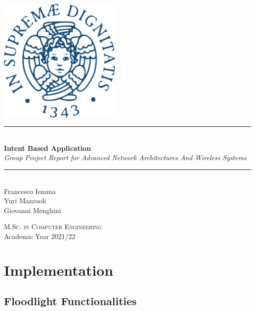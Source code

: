 \documentclass[a4paper]{report}
\newcommand{\HRule}{\rule{\linewidth}{0.5mm}}
\begin{document}
	\begin{titlepage}
		\begin{center}
			
			\includegraphics[width=0.45\textwidth]{img/unipi.png}~\\[2.5cm]
			
			
			\HRule \\[0.4cm]
			{ \LARGE 
				\textbf{Intent Based Application}\\[0.4cm]
				\emph{Group Project Report for Advanced Network Architectures And Wireless Systems}\\[0.4cm]
			}
			\HRule \\[1.5cm]
			
			
			
			{ \large
				Francesco Iemma \\[0.1cm]
				Yuri Mazzuoli \\[0.1cm]
				Giovanni Menghini \\[0.1cm]
			}
			
			\vfill
			
			\textsc{\large M.Sc. in Computer Engineering}\\[0.4cm]
			
			
			{\large Academic Year 2021/22}
			
		\end{center}
	\end{titlepage}
	
	
	\tableofcontents
	\newpage
	
	
	
	
	\chapter{Implementation}
	
	\section{Floodlight Functionalities}
\end{document}
